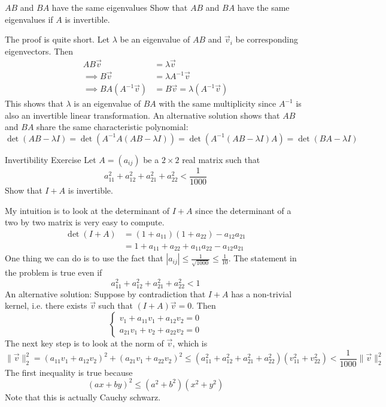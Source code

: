\documentclass[../main]{subfiles}
\begin{document}
\begin{bbox}{$AB$ and $BA$ have the same eigenvalues}
    Show that $AB$ and $BA$ have the same eigenvalues if $A$ is invertible.
\end{bbox}
\begin{solution}
    The proof is quite short. Let $\lambda$ be an eigenvalue of $AB$ and $\vec v_i$ be corresponding eigenvectors. Then 
    \begin{align*}
        AB \vec v &= \lambda \vec v\\
        \implies B\vec v &= \lambda A^{-1}\vec v\\
        \implies B A (A^{-1}\vec v) &= B\vec v = \lambda (A^{-1}\vec v)
    \end{align*}
    This shows that $\lambda$ is an eigenvalue of $BA$ with the same multiplicity since $A^{-1}$ is also an invertible linear transformation.
    \newline
    An alternative solution shows that $AB$ and $BA$ share the same characteristic polynomial:
    \[
    \det(AB - \lambda I) = \det(A^{-1}A(AB-\lambda I)) = \det(A^{-1}(AB-\lambda I)A) = \det(BA-\lambda I)
    \]
\end{solution}
\begin{bbox}{Invertibility Exercise}
    Let $A = (a_{ij})$ be a $2\times 2$ real matrix such that 
    \[
    a_{11}^2 + a_{12}^2 + a_{21}^2 + a_{22}^2 < \frac{1}{1000}
    \]
    Show that $I + A$ is invertible.
\end{bbox}
\begin{solution}
    My intuition is to look at the determinant of $I + A$ since the determinant of a two by two matrix is very easy to compute.
    \begin{align*}
    \det(I+A) &= (1+a_{11})(1+a_{22})-a_{12}a_{21}\\
    &=1 + a_{11}+ a_{22}+a_{11}a_{22}-a_{12}a_{21}
    \end{align*}
    One thing we can do is to use the fact that $|a_{ij}|\leq \frac{1}{\sqrt{1000}}\le \frac{1}{10}$. The statement in the problem is true even if \[
     a_{11}^2 + a_{12}^2 + a_{21}^2 + a_{22}^2 < 1
    \]
    \newline
    An alternative solution: Suppose by contradiction that $I+A$ has a non-trivial kernel, i.e. there exists $\vec v$ such that $(I+A)\vec v = 0$. Then 
    \[
    \begin{cases}
        v_1 + a_{11} v_1 + a_{12}v_2 = 0\\
        a_{21}v_1 + v_2 + a_{22}v_2 = 0
    \end{cases}
    \]
    The next key step is to look at the norm of $\vec v$, which is 
    \[
    \|\vec v\|^2_2 = (a_{11}v_1 + a_{12}v_2)^2 +(a_{21}v_1 + a_{22}v_2)^2 \leq (a_{11}^2 + a_{12}^2 + a_{21}^2 + a_{22}^2)(v_{11}^2 + v_{22}^2) < \frac{1}{1000}\|\vec v\|_2^2
    \]
    The first inequality is true because 
    \[
    (ax+by)^2 \leq (a^2+b^2)(x^2+y^2)
    \]
    Note that this is actually Cauchy schwarz.
\end{solution}
\end{document}
